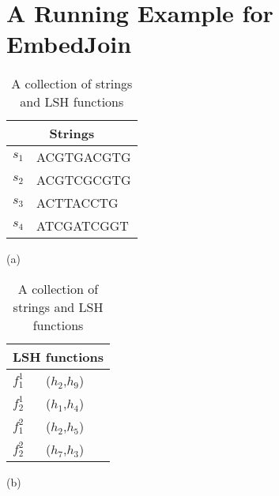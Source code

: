 \section{A Running Example for EmbedJoin}
\label{sec:example}

\begin{table}[h]
\begin{minipage}[]{0.25\textwidth}
\centering
\begin{tabular}{ |l|l| }
  \hline
  \multicolumn{2}{|c|}{Strings} \\
  \hline
  $s_1$ & ACGTGACGTG \\
  $s_2$ & ACGTCGCGTG\\
  $s_3$ & ACTTACCTG \\
  $s_4$ & ATCGATCGGT\\
  \hline
\end{tabular}
\centerline{(a)}
\end{minipage}
\begin{minipage}[]{0.2\textwidth}
\centering
\begin{tabular}{ |l|l| }
  \hline
  \multicolumn{2}{|c|}{LSH functions } \\
  \hline
  $f_1^1$ & ($h_2$,$h_9$) \\   \hline
  $f_2^1$ &  ($h_1$,$h_4$) \\   \hline
  $f_1^2$ &  ($h_2$,$h_5$)  \\   \hline
  $f_2^2$ &  ($h_7$,$h_3$) \\
  \hline
\end{tabular}
\centerline{(b)}
\end{minipage}
\caption{A collection of strings and LSH functions}  
\label{tab:strs}
\end{table}



